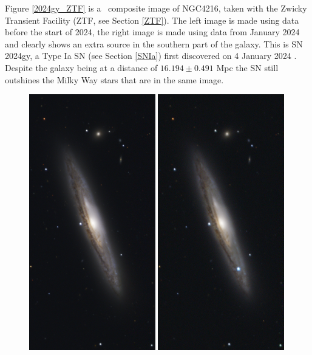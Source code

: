 \documentclass[a4paper,oneside,12pt, class=Latex/Classes/PhDthesisPSnPDF, crop=false]{standalone}
\begin{document}
Figure \ref{2024gy_ZTF} is a \ztfg\ztfr\ztfi\ composite image of NGC4216, taken with the Zwicky Transient Facility (ZTF, see Section \ref{ZTF}). The left image is made using data before the start of 2024, the right image is made using data from January 2024 and clearly shows an extra source in the southern part of the galaxy. This is SN 2024gy, a Type Ia SN (see Section \ref{SNIa}) first discovered on 4 January 2024 \citep{2024gy_disc}. Despite the galaxy being at a distance of $16.194 \pm 0.491$ Mpc \citep{2024gy_z} the SN still outshines the Milky Way stars that are in the same image.

\begin{figure}
    \centering
    \includegraphics[width=0.49\textwidth]{../Images/chapter_1/SN2024gy_pre-SN.png}
    \includegraphics[width=0.49\textwidth]{../Images/chapter_1/SN2024gy_active.png}

\end{figure}
\end{document}
